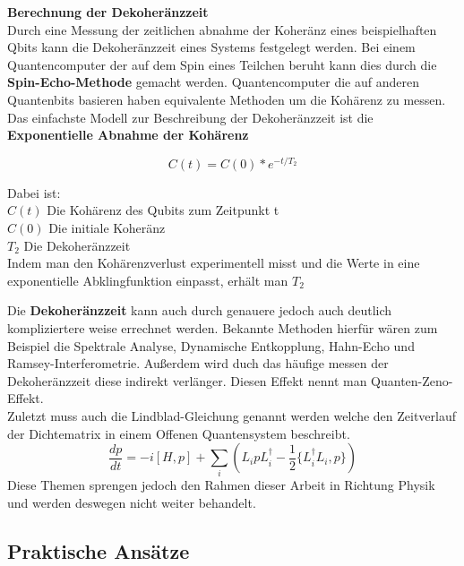 {\bf Berechnung der Dekoheränzzeit}\\
Durch eine Messung der zeitlichen abnahme der Koheränz eines beispielhaften Qbits kann die Dekoheränzzeit eines Systems festgelegt werden.
Bei einem Quantencomputer der auf dem Spin eines Teilchen beruht kann dies durch die {\bf Spin-Echo-Methode} gemacht werden.
Quantencomputer die auf anderen Quantenbits basieren haben equivalente Methoden um die Kohärenz zu messen.\\

Das einfachste Modell zur Beschreibung der Dekoheränzzeit ist die {\bf Exponentielle Abnahme der Kohärenz}

\begin{equation}
    C(t) = C(0)*e^{-t/T_2}
\end{equation}

Dabei ist:\\
$C(t)$ Die Kohärenz des Qubits zum Zeitpunkt t\\
$C(0)$ Die initiale Koheränz\\
$T_2$ Die Dekoheränzzeit\\

Indem man den Kohärenzverlust experimentell misst und die Werte in eine exponentielle Abklingfunktion einpasst, erhält man $T_2$\\

\begin{tcolorbox}[title=Kommentar,
    title filled=false,
    colback=cyan!5!white,
    colframe=cyan!75!black]
    Die \textbf{Dekoheränzzeit} kann auch durch genauere jedoch auch deutlich kompliziertere weise errechnet werden.
    Bekannte Methoden hierfür wären zum Beispiel die Spektrale Analyse, Dynamische Entkopplung, Hahn-Echo und Ramsey-Interferometrie.
    Außerdem wird duch das häufige messen der Dekoheränzzeit diese indirekt verlänger. Diesen Effekt nennt man Quanten-Zeno-Effekt.\\
    Zuletzt muss auch die Lindblad-Gleichung genannt werden welche den Zeitverlauf der Dichtematrix in einem Offenen Quantensystem beschreibt.
    \begin{equation}
        \frac{dp}{dt} = -i[H,p]+\sum_i(L_ipL^\dagger_i-\frac{1}{2}\{L^\dagger_i L_i,p\})
    \end{equation}
    Diese Themen sprengen jedoch den Rahmen dieser Arbeit in Richtung Physik und werden deswegen nicht weiter behandelt.
\end{tcolorbox}

\subsection{Praktische Ansätze}
\label{sub:praktische_ansaetze}


